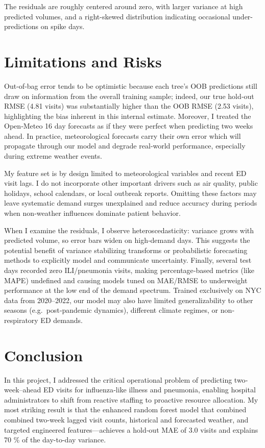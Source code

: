 \documentclass[11pt]{article}
\begin{document}
The residuals are roughly centered around zero, with larger variance at high predicted volumes, and a right-skewed distribution indicating occasional under-predictions on spike days.

\section{Limitations and Risks}

Out‐of‐bag error tends to be optimistic because each tree’s OOB predictions still draw on information from the overall training sample; indeed, our true hold‐out RMSE (4.81 visits) was substantially higher than the OOB RMSE (2.53 visits), highlighting the bias inherent in this internal estimate. Moreover, I treated the Open‐Meteo 16 day forecasts as if they were perfect when predicting two weeks ahead. In practice, meteorological forecasts carry their own error which will propagate through our model and degrade real‐world performance, especially during extreme weather events.

My feature set is by design limited to meteorological variables and recent ED visit lags. I do not incorporate other important drivers such as air quality, public holidays, school calendars, or local outbreak reports. Omitting these factors may leave systematic demand surges unexplained and reduce accuracy during periods when non‐weather influences dominate patient behavior.

When I examine the residuals, I observe heteroscedasticity: variance grows with predicted volume, so error bars widen on high‐demand days. This suggests the potential benefit of variance stabilizing transforms or probabilistic forecasting methods to explicitly model and communicate uncertainty. Finally, several test days recorded zero ILI/pneumonia visits, making percentage‐based metrics (like MAPE) undefined and causing models tuned on MAE/RMSE to underweight performance at the low end of the demand spectrum. Trained exclusively on NYC data from 2020–2022, our model may also have limited generalizability to other seasons (e.g.\ post‐pandemic dynamics), different climate regimes, or non‐respiratory ED demands.


\section{Conclusion}

In this project, I addressed the critical operational problem of predicting two‐week–ahead ED visits for influenza‐like illness and pneumonia, enabling hospital administrators to shift from reactive staffing to proactive resource allocation. My most striking result is that the enhanced random forest model that combined combined two-week lagged visit counts, historical and forecasted weather, and targeted engineered features—achieves a hold‐out MAE of 3.0 visits and explains 70 \% of the day-to-day variance.  
\end{document}
